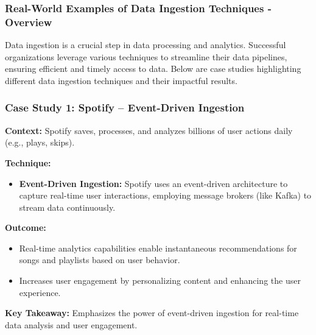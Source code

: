 \documentclass{beamer}
\begin{document}
\begin{frame}[fragile]
    \frametitle{Real-World Examples of Data Ingestion Techniques - Overview}
    Data ingestion is a crucial step in data processing and analytics.  
    Successful organizations leverage various techniques to streamline their data pipelines, ensuring efficient and timely access to data.  
    Below are case studies highlighting different data ingestion techniques and their impactful results.
\end{frame}

\begin{frame}[fragile]
    \frametitle{Case Study 1: Spotify – Event-Driven Ingestion}
    
    \textbf{Context:}  
    Spotify saves, processes, and analyzes billions of user actions daily (e.g., plays, skips).  
    
    \textbf{Technique:}  
    \begin{itemize}
        \item \textbf{Event-Driven Ingestion:}  
        Spotify uses an event-driven architecture to capture real-time user interactions, employing message brokers (like Kafka) to stream data continuously.
    \end{itemize}
    
    \textbf{Outcome:}  
    \begin{itemize}
        \item Real-time analytics capabilities enable instantaneous recommendations for songs and playlists based on user behavior.
        \item Increases user engagement by personalizing content and enhancing the user experience.
    \end{itemize}
    
    \textbf{Key Takeaway:}  
    Emphasizes the power of event-driven ingestion for real-time data analysis and user engagement.
\end{frame}
\end{document}
